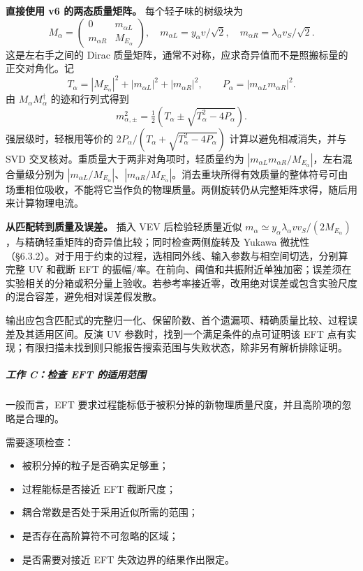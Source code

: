 \documentclass[
]{article}
\providecommand{\tightlist}{%
  \setlength{\itemsep}{0pt}\setlength{\parskip}{0pt}}
\begin{document}
\textbf{直接使用 v6 的两态质量矩阵。} 每个轻子味的树级块为 \[
M_\alpha=\begin{pmatrix}0&m_{\alpha L}\\m_{\alpha R}&M_{E_\alpha}\end{pmatrix},
\quad m_{\alpha L}=y_\alpha v/\sqrt2,\quad
m_{\alpha R}=\lambda_\alpha v_S/\sqrt2.
\] 这是左右手之间的 Dirac
质量矩阵，通常不对称，应求奇异值而不是照搬标量的正交对角化。记 \[
T_\alpha=|M_{E_\alpha}|^2+|m_{\alpha L}|^2+|m_{\alpha R}|^2,\qquad
P_\alpha=|m_{\alpha L}m_{\alpha R}|^2.
\] 由 \(M_\alpha M_\alpha^\dagger\) 的迹和行列式得到 \[
m_{\alpha,\pm}^2=\tfrac12\left(T_\alpha\pm
\sqrt{T_\alpha^2-4P_\alpha}\right).
\] 强层级时，轻根用等价的
\(2P_\alpha/(T_\alpha+\sqrt{T_\alpha^2-4P_\alpha})\)
计算以避免相减消失，并与 SVD
交叉核对。重质量大于两非对角项时，轻质量约为
\(|m_{\alpha L}m_{\alpha R}/M_{E_\alpha}|\)，左右混合量级分别为
\(|m_{\alpha L}/M_{E_\alpha}|\)、\(|m_{\alpha R}/M_{E_\alpha}|\)。消去重块所得有效质量的整体符号可由场重相位吸收，不能将它当作负的物理质量。两侧旋转仍从完整矩阵求得，随后用来计算物理电流。

\textbf{从匹配转到质量及误差。} 插入 VEV 后检验轻质量近似
\(m_\alpha\simeq y_\alpha\lambda_\alpha vv_S/(2M_{E_\alpha})\)，与精确轻重矩阵的奇异值比较；同时检查两侧旋转及
Yukawa
微扰性（§6.3.2）。对于用于约束的过程，选相同外线、输入参数与相空间切选，分别算完整
UV 和截断 EFT
的振幅/率。在前向、阈值和共振附近单独加密；误差须在实验相关的分箱或积分量上验收。若参考率接近零，改用绝对误差或包含实验尺度的混合容差，避免相对误差假发散。

输出应包含匹配式的完整归一化、保留阶数、首个遗漏项、精确质量比较、过程误差及其适用区间。反演
UV 参数时，找到一个满足条件的点可证明该 EFT
点有实现；有限扫描未找到则只能报告搜索范围与失败状态，除非另有解析排除证明。

\subparagraph{工作 C：检查 EFT
的适用范围}\label{ux5de5ux4f5c-cux68c0ux67e5-eft-ux7684ux9002ux7528ux8303ux56f4}

一般而言，EFT
要求过程能标低于被积分掉的新物理质量尺度，并且高阶项的忽略是合理的。

需要逐项检查：

\begin{itemize}
\tightlist
\item
  被积分掉的粒子是否确实足够重；
\item
  过程能标是否接近 EFT 截断尺度；
\item
  耦合常数是否处于采用近似所需的范围；
\item
  是否存在高阶算符不可忽略的区域；
\item
  是否需要对接近 EFT 失效边界的结果作出限定。
\end{itemize}
\end{document}
